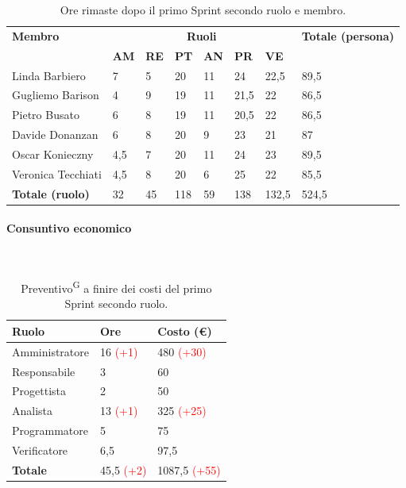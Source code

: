 \documentclass[8pt]{article}
\newcommand{\glossterm}[1]{#1\textsuperscript{G}} %
\newcommand{\subsubsubsection}[1]{\paragraph{#1}\mbox{}\\}
\begin{document}
\begin{table}[ht!]
	\centering
	\begin{tabular}{p{4cm} p{1cm} p{1cm} p{1cm} p{1cm} p{1cm} p{1cm} p{3cm}}
		\toprule
        \textbf{Membro} & \multicolumn{6}{c}{\textbf{Ruoli}} & \textbf{Totale (persona)}\\
		& \textbf{AM} & \textbf{RE} & \textbf{PT} & \textbf{AN} & \textbf{PR} & \textbf{VE}\\
		\midrule
        Linda Barbiero & 7 & 5 & 20 & 11 & 24 & 22,5 & 89,5 \\ 
        Gugliemo Barison & 4 & 9 & 19 & 11 & 21,5 & 22 & 86,5 \\ 
        Pietro Busato & 6 & 8 & 19 & 11 & 20,5 & 22 & 86,5 \\ 
        Davide Donanzan & 6 & 8 & 20 & 9 & 23 & 21 & 87 \\ 
        Oscar Konieczny & 4,5 & 7 & 20 & 11 & 24 & 23 & 89,5 \\ 
        Veronica Tecchiati & 4,5 & 8 & 20 & 6 & 25 & 22 & 85,5 \\ 
        \bottomrule
        \textbf{Totale (ruolo)} & 32 & 45 & 118 & 59 & 138 & 132,5 & 524,5 \\ 
	\end{tabular}
	\caption{Ore rimaste dopo il primo Sprint secondo ruolo e membro.}
	\label{table:Ore rimaste dopo il primo Sprint secondo ruolo e membro}
\end{table}
\subsubsubsection{Consuntivo economico}
\begin{table}[ht!]
	\centering
	\begin{tabular}{p{4cm} p{3cm} p{4cm}}
        \toprule
        \textbf{Ruolo} & \textbf{Ore} & \textbf{Costo (€)} \\
        \midrule
        Amministratore & 16 \textcolor{red}{(+1)} & 480 \textcolor{red}{(+30)} \\ 
        Responsabile & 3 & 60 \\ 
        Progettista & 2 & 50 \\ 
        Analista & 13 \textcolor{red}{(+1)} & 325 \textcolor{red}{(+25)} \\ 
        Programmatore & 5 & 75 \\ 
        Verificatore & 6,5 & 97,5 \\
        \bottomrule
        \textbf{Totale} & 45,5 \textcolor{red}{(+2)} & 1087,5 \textcolor{red}{(+55)} \\ 
    \end{tabular}
    \caption{\glossterm{Preventivo} a finire dei costi del primo Sprint secondo ruolo.}
	\label{table:Preventivo a finire dei costi del primo Sprint secondo ruolo}
\end{table}
\end{document}
